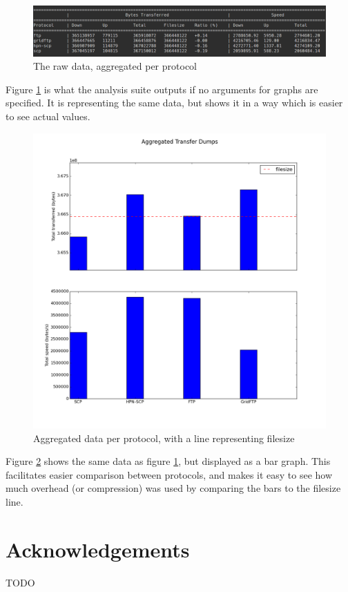 \documentclass{sig-alternate-05-2015}
\begin{document}
\begin{figure}
	\centering
	\includegraphics[width=\textwidth]{img/testdata_detail.png}
	\caption{The raw data, aggregated per protocol
	         \label{fig:testdata_detail}}
\end{figure}
Figure \ref{fig:testdata_detail} is what the analysis suite outputs if no arguments for graphs are specified. It is representing the same data, but shows it in a way which is easier to see actual values.

\begin{figure}
	\centering
	\includegraphics[width=\textwidth]{img/testdata_aggregate.png}
	\caption{Aggregated data per protocol, with a line representing filesize
	         \label{fig:testdata_aggregate}}
\end{figure}

Figure \ref{fig:testdata_aggregate} shows the same data as figure \ref{fig:testdata_detail}, but displayed as a bar graph. This facilitates easier comparison between protocols, and makes it easy to see how much overhead (or compression) was used by comparing the bars to the filesize line.

\section{Acknowledgements}
TODO


 
\end{document}
